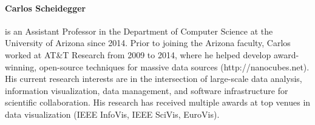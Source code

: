 \documentclass[journal]{vgtc}                %
\begin{document}
\paragraph*{Carlos Scheidegger} is an Assistant Professor in the Department of Computer Science at the University of Arizona since 2014. Prior to joining the Arizona faculty, Carlos worked at AT\&T Research from 2009 to 2014, where he helped develop award-winning, open-source techniques for massive data sources (http://nanocubes.net). His current research interests are in the intersection of large-scale data analysis, information visualization, data management, and software infrastructure for scientific collaboration. His research has received multiple awards at top venues in data visualization (IEEE InfoVis, IEEE SciVis, EuroVis).



%
%
\end{document}
